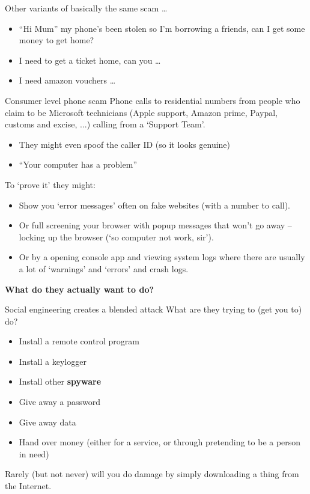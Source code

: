\documentclass[xcolor=table]{beamer}
\begin{document}
\begin{frame}{Other variants of basically the same scam \ldots}

	\begin{itemize}
		\item ``Hi Mum'' my phone's been stolen so I'm borrowing a friends, can I get some money to get home?
		\item  I need to get a ticket home, can you \ldots
		\item  I need amazon vouchers \ldots
	\end{itemize}

	\end{frame}
\begin{frame}{Consumer level phone scam}
		Phone calls to residential numbers from people who claim to be Microsoft technicians (Apple support, 	Amazon prime, Paypal, customs and excise, ...) calling from a `Support Team'. 
	\begin{itemize}
		\item They might even spoof the caller ID {\small(so it looks genuine)}
		\item ``Your computer has a problem''
	\end{itemize}

	To `prove it' they might:
	\begin{itemize}
		\item Show you `error messages' often on fake websites (with a number to call). 
		\item Or full screening your browser with popup messages that won't go away 
		-- locking up the browser {(\small `so computer not work, sir')}.
		\item Or by a opening console app and viewing system logs where there are usually a 
		lot of `warnings' and `errors' and crash logs. 
	\end{itemize}

	{\bf What do they actually want to do?}

\end{frame}

\begin{frame}{Social engineering creates a blended attack}
	What are they trying to (get you to) do? 

	\begin{itemize}
		\item Install a remote control program
		\item Install a keylogger
		\item Install other \textbf{spyware}
		\item Give away a password
		\item Give away data
		\item Hand over money (either for a service,
			or through pretending to be a person
			in need)
	\end{itemize}
		

	
	\vspace{0.5em}

	Rarely (but not never) will you do damage by simply downloading a thing from the Internet. 
\end{frame}
\end{document}
